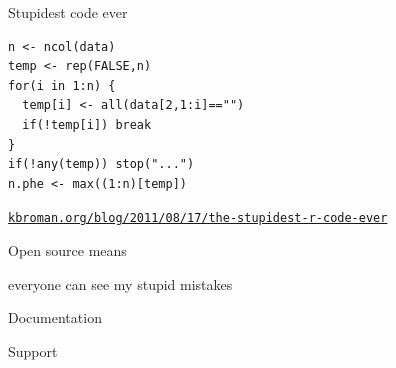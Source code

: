 \documentclass[12pt,t]{beamer}
\begin{document}
\begin{frame}[c,fragile]{Stupidest code ever}

\begin{center}
\begin{minipage}[c]{9.3cm}
\begin{semiverbatim}
\lstset{basicstyle=\normalsize}
\begin{lstlisting}[linewidth=9.3cm]
n <- ncol(data)
temp <- rep(FALSE,n)
for(i in 1:n) {
  temp[i] <- all(data[2,1:i]=="")
  if(!temp[i]) break
}
if(!any(temp)) stop("...")
n.phe <- max((1:n)[temp])
\end{lstlisting}
\end{semiverbatim}
\end{minipage}
\end{center}

\vspace{3mm}

\hfill \href{http://kbroman.org/blog/2011/08/17/the-stupidest-r-code-ever}{\scriptsize \lolit \tt kbroman.org/blog/2011/08/17/the-stupidest-r-code-ever}

\end{frame}


\begin{frame}[c]{}

  \large

  {\hilit Open source} {\lolit means}

  everyone can see my stupid mistakes

  \bigskip \bigskip \bigskip


\end{frame}


\begin{frame}{}

\vspace*{16.7mm}

\centerline{\Large Documentation}

\end{frame}



\begin{frame}{}

\vspace*{16.7mm}

\centerline{\Large Support}

\end{frame}
\end{document}
